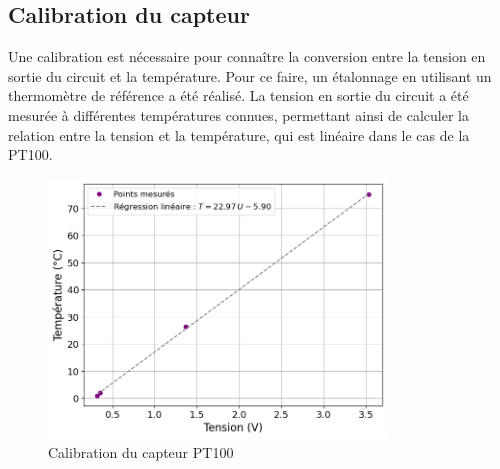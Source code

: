 \subsection{Calibration du capteur}
Une calibration est nécessaire pour connaître la conversion entre la tension en sortie du circuit et la température.
Pour ce faire, un étalonnage en utilisant un thermomètre de référence a été réalisé. La tension en sortie du circuit a été mesurée à différentes températures connues, permettant ainsi de calculer la relation entre la tension et la température, qui est linéaire dans le cas de la PT100.

\begin{figure}[H]
    \centering
    \includegraphics[width=0.8\textwidth]{assets/figures/CalibrationPT100.png}
    \caption{Calibration du capteur PT100}
    \label{fig:CalibrationPT100}
\end{figure}


